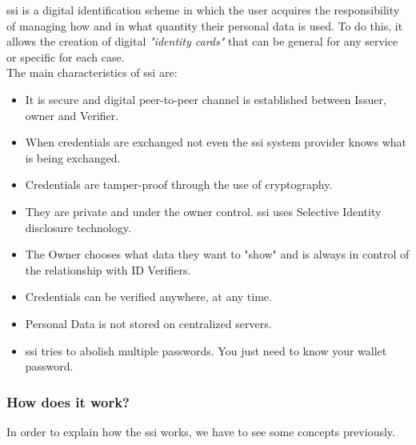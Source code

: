             \acrfull{ssi} is a digital identification scheme in which the user acquires the responsibility of managing how and in what quantity their personal data is used. To do this, it allows the creation of digital \textit{"identity cards"} that can be general for any service or specific for each case. \\
            The main characteristics of \acrlong{ssi} are\cite{ssi-guide}:
            \begin{itemize}
                \item It is secure and digital peer-to-peer channel is established between Issuer, owner and Verifier.
                \item When credentials are exchanged not even the \acrlong{ssi} system provider knows what is being exchanged.
                \item Credentials are tamper-proof through the use of cryptography.
                \item They are private and under the owner control. \acrshort{ssi} uses Selective Identity disclosure technology.
                \item The Owner chooses what data they want to "show" and is always in control of the relationship with ID Verifiers.
                \item Credentials can be verified anywhere, at any time.
                \item Personal Data is not stored on centralized servers.
                \item \acrshort{ssi} tries to abolish multiple passwords. You just need to know your wallet password.
            \end{itemize}

            \subsubsection{How does it work?}
                In order to explain how the \acrshort{ssi} works, we have to see some concepts previously.
